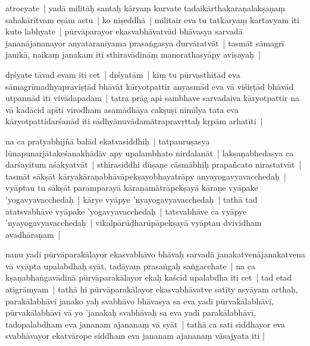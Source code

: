 \documentclass[article,12pt,a4paper]{memoir}%
\newcounter{parCount}
\begin{document}
	  
	  \pstart \leavevmode%
	\label{thakur75-75.10}atrocyate | yadā militāḥ santaḥ kāryaṃ kurvate tadaikārthakaraṇalakṣaṇaṃ sahakāritvam eṣām astu | ko niṣeddhā | militair eva tu tatkāryaṃ kartavyam iti kuto labhyate | pūrvāparayor ekasvabhāvatvād bhāvasya sarvadā jananājananayor anyataraniyama prasaṅgasya durvāratvāt | tasmāt sāmagrī janikā, naikaṃ janakam iti sthiravādināṃ manorathasyāpy aviṣayaḥ |
	{}
	\pend%
      

	  
	  \pstart \leavevmode%
	\label{thakur75-75.15}dṛśyate tāvad evam iti cet | dṛśyatām | kiṃ tu pūrvasthitād eva sāmagrīmadhyapraviṣṭād bhāvāt kāryotpattir anyasmād eva vā viśiṣṭād bhāvād utpannād iti vivādapadam | tatra prāg api sambhave sarvadaiva kāryotpattir na vā kadācid apīti virodham asamādhāya cakṣuṣī nimīlya tata eva kāryotpattidarśanād iti sādhyānuvādamātrapravṛttaḥ kṛpām arhatīti |
	{}
	\pend%
      

	  
	  \pstart \leavevmode%
	\label{thakur75-75.20}na ca pratyabhijñā balād ekatvasiddhiḥ | tatpauruṣasya lūnapunarjātakeśanakhādāv apy upalambhato nirdalanāt | lakṣaṇabhedasya ca darśayitum aśakyatvāt | sthirasiddhi dūṣaṇe cāsmābhiḥ prapañcato nirastatvāt |\label{thakur75-75.22} tasmāt sākṣāt kāryakāraṇabhāvāpekṣayobhayatrāpy anyayogavyavacchedaḥ | vyāptau tu sākṣāt paramparayā kāraṇamātrāpekṣayā kāraṇe vyāpake 'yogavyavacchedaḥ | kārye vyāpye 'nyayogavyavacchedaḥ | tathā tad atatsvabhāve vyāpake 'yogavyavacchedaḥ | tatsvabhāve ca vyāpye 'nyayogavyavacchedaḥ | vikalpārūḍharūpāpekṣayā vyāptau dvividham avadhāraṇam |
	{}
	\pend%
      

	  
	  \pstart \leavevmode%
	\label{thakur75-75.27}nanu yadi pūrvāparakālayor ekasvabhāvo bhāvaḥ sarvadā janakatvenājanakatvena vā vyāpta upalabdhaḥ syāt, tadāyaṃ prasaṅgaḥ saṅgacchate | na ca kṣaṇabhaṅgavādinā pūrvāparakālayor ekaḥ kaścid upalabdha iti cet |\label{thakur75-76.1} tad etad atigrāmyam | tathā hi pūrvāparakālayor ekasvabhāvatve satīty asyāyam arthaḥ, parakālabhāvī janako yaḥ svabhāvo bhāvasya sa eva yadi pūrvakālabhāvī, pūrvakālabhāvī vā yo 'janakaḥ svabhāvaḥ sa eva yadi parakālabhāvī, tadopalabdham eva jananam ajananaṃ vā syāt | tathā ca sati siddhayor eva svabhāvayor ekatvārope siddham eva jananam ajananaṃ vāsajyata iti |
	{}
	\pend%
      
\end{document}
